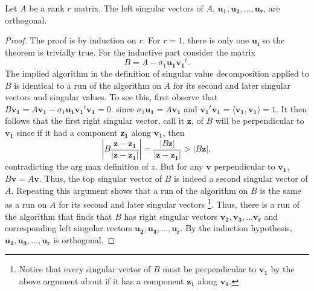 \begin{theorem}
  Let \(A\) be a rank \(r\) matrix. The left singular vectors of \(A\), \(\mathbf{u_1}, \mathbf{u_2}, \dots  , \mathbf{u_r}  \), are orthogonal.    
\end{theorem}
\begin{proof}
  The proof is by induction on \(r\). For \(r=1\), there is only one \(\mathbf{u_i} \) so the theorem is trivially true. For the inductive part consider the matrix
  \[
    B=A-\sigma _1 \mathbf{u_1} \mathbf{v_1}^t.  
  \]
  The implied algorithm in the definition of singular value decomposition applied to \(B\) is identical to a run of the algorithm on \(A\) for its second and later singular vectors and singular values. To see this, first observe that \(B \mathbf{v_1} = A \mathbf{v_1} - \sigma_1 \mathbf{u_1} \mathbf{v_1}^t \mathbf{v_1} = 0.  \) since \(\sigma _1 \mathbf{u_1} = A \mathbf{v_1}  \) and \(\mathbf{v_1}^t \mathbf{v_1} = \langle \mathbf{v_1}, \mathbf{v_1}   \rangle = 1   \). It then follows that the first right singular vector, call it \(\mathbf{z} \), of \(B\) will be perpendicular to \(\mathbf{v_1} \) since if it had a component \(\mathbf{z_1} \) along \(\mathbf{v_1} \), then
  \[
    \left\vert B \frac{\mathbf{z} - \mathbf{z_1} }{\vert \mathbf{z} - \mathbf{z_1} \vert } \right\vert = \frac{\vert B \mathbf{z}  \vert }{\vert \mathbf{z} - \mathbf{z_1} \vert } > \vert B \mathbf{z}  \vert,
  \]     
  contradicting the arg max definition of \(z\). But for any \(\mathbf{v} \) perpendicular to \(\mathbf{v_1} \), \(B \mathbf{v}  = A \mathbf{v} \). Thus, the top singular vector of \(B\) is indeed a second singular vector of \(A\). Repeating this argument shows that a run of the algorithm on \(B\) is the same as a run on \(A\) for its second and later singular vectors \footnote{Notice that every singular vector of \(B\) must be perpendicular to \(\mathbf{v_1} \) by the above argument about if it has a component \(\mathbf{z_1} \) along \(\mathbf{v_1} \).    }.  Thus, there is a run of the algorithm that finds that \(B\) has right singular vectors \(\mathbf{v_2}, \mathbf{v_3}, \dots \mathbf{v_r}   \) and corresponding left singular vectors \(\mathbf{u_2}, \mathbf{u_3}, \dots , \mathbf{u_r}   \). By the induction hypothesis, \(\mathbf{u_2}, \mathbf{u_3}, \dots , \mathbf{u_r}\) is orthogonal. 
  

\end{proof}
